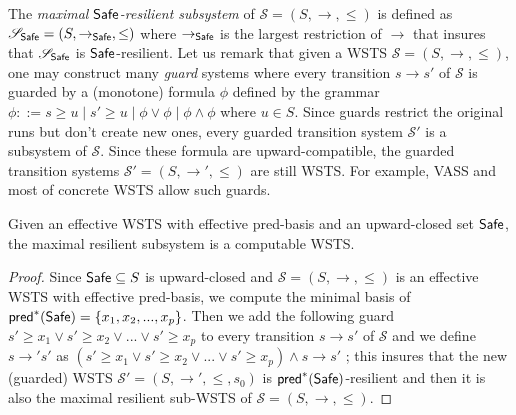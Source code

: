The \emph{maximal $\textsf{Safe}$-resilient subsystem} of $\mathscr{S}=(S,\rightarrow,\leq)$ is defined as $\mathscr{S}_{\textsf{Safe}}=(S,\rightarrow_{\textsf{Safe}},\leq)$ where $\rightarrow_{\textsf{Safe}}$ is the largest restriction of $\rightarrow$ that insures that $\mathscr{S}_{\textsf{Safe}}$ is $\textsf{Safe}$-resilient.
Let us remark that given a WSTS $\mathscr{S}=(S, \rightarrow, \leq)$, one may construct many \emph{guard} systems where every transition $s \rightarrow s'$ of $\mathscr{S}$ is guarded by a (monotone) formula $\phi$ defined by the grammar $\phi ::= s \geq u \mid s' \geq u \mid \phi \vee \phi \mid \phi \wedge \phi$ where $u \in S$. Since guards restrict the original runs but don't create new ones, every guarded transition system $\mathscr{S'}$ is a subsystem of $\mathscr{S}$. Since these formula are upward-compatible, the guarded transition systems $\mathscr{S'}=(S, \rightarrow', \leq)$ are still WSTS.
%
For example, VASS and most of concrete WSTS allow such guards.

\begin{theorem}{}
Given an effective WSTS with effective pred-basis and an upward-closed set $\textsf{Safe}$, the maximal resilient subsystem is a computable WSTS.
\end{theorem}

\begin{proof}
Since $\textsf{Safe} \subseteq S$ is upward-closed and $\mathscr{S}=(S, \rightarrow, \leq)$ is an effective WSTS with effective pred-basis, we compute the minimal basis of $\textsf{pred}^*(\textsf{Safe})=\{x_1,x_2,...,x_p\}$. 
%
%
Then we add the following guard $s' \geq x_1  	\vee s' \geq x_2  	\vee...	\vee s' \geq x_p$ to every transition $s \rightarrow s'$ of $\mathscr{S}$ and we define  $s \rightarrow' s'$ as $(s' \geq x_1  	\vee s' \geq x_2  	\vee...	\vee s' \geq x_p) \wedge s \rightarrow s'$ ; this insures that the new (guarded) WSTS $\mathscr{S'}=(S, \rightarrow', \leq,s_0)$ is $\textsf{pred}^*(\textsf{Safe})$-resilient and then it is also the maximal resilient sub-WSTS of $\mathscr{S}=(S, \rightarrow, \leq)$.
		\end{proof}
%

\fi


